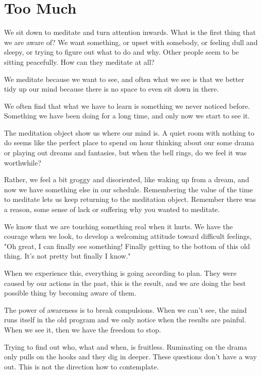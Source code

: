 \hypertarget{too-much-1}{%
\chapter{Too Much}\label{too-much-1}}

We sit down to meditate and turn attention inwards. What is the first
thing that we are aware of? We want something, or upset with somebody,
or feeling dull and sleepy, or trying to figure out what to do and why.
Other people seem to be sitting peacefully. How can they meditate at
all?

We meditate because we want to see, and often what we see is that we
better tidy up our mind because there is no space to even sit down in
there.

We often find that what we have to learn is something we never noticed
before. Something we have been doing for a long time, and only now we
start to see it.

The meditation object show us where our mind is. A quiet room with
nothing to do seems like the perfect place to spend on hour thinking
about our some drama or playing out dreams and fantasies, but when the
bell rings, do we feel it was worthwhile?

Rather, we feel a bit groggy and disoriented, like waking up from a
dream, and now we have something else in our schedule. Remembering the
value of the time to meditate lets us keep returning to the meditation
object. Remember there was a reason, some sense of lack or suffering why
you wanted to meditate.

We know that we are touching something real when it hurts. We have the
courage when we look, to develop a welcoming attitude toward difficult
feelings, "Oh great, I can finally see something! Finally getting to the
bottom of this old thing. It's not pretty but finally I know."

When we experience this, everything is going according to plan. They
were caused by our actions in the past, this is the result, and we are
doing the best possible thing by becoming aware of them.

The power of awareness is to break compulsions. When we can't see, the
mind runs itself in the old program and we only notice when the results
are painful. When we see it, then we have the freedom to stop.

Trying to find out who, what and when, is fruitless. Ruminating on the
drama only pulls on the hooks and they dig in deeper. These questions
don't have a way out. This is not the direction how to contemplate.

